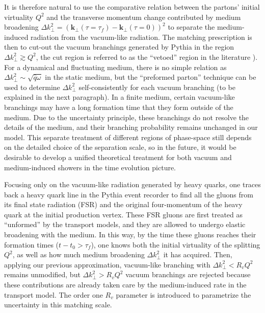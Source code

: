 It is therefore natural to use the comparative relation between the partons' initial virtuality $Q^2$ and the transverse momentum change contributed by medium broadening $\Delta k_\perp^2 = (\mathbf{k}_\perp(\tau=\tau_f) - \mathbf{k}_\perp(\tau=0))^2$ to separate the medium-induced radiation from the vacuum-like radiation.
The matching prescription is then to cut-out the vacuum branchings generated by Pythia in the region $\Delta k_\perp^2 \gtrsim Q^2$, the cut region is referred to as the ``vetoed'' region in the literature \cite{PhysRevLett.120.232001}).
For a dynamical and fluctuating medium, there is no simple relation as $\Delta k_\perp^2\sim \sqrt{\hat{q}\omega}$ in the static medium, but the ``preformed parton'' technique can be used to determine $\Delta k_\perp^2$ self-consistently for each vacuum branching (to be explained in the next paragraph).
In a finite medium, certain vacuum-like branchings may have a long formation time that they form outside of the medium.
Due to the uncertainty principle, these branchings do not resolve the details of the medium, and their branching probability remains unchanged in our model.
This separate treatment of different regions of phase-space still depends on the detailed choice of the separation scale, so in the future, it would be desirable to develop a unified theoretical treatment for both vacuum and medium-induced showers in the time evolution picture.

Focusing only on the vacuum-like radiation generated by heavy quarks, one traces back a heavy quark line in the Pythia event recorder to find all the gluons from its final state radiation (FSR) and the original four-momentum of the heavy quark at the initial production vertex.
These FSR gluons are first treated as ``unformed'' by the transport models, and they are allowed to undergo elastic broadening with the medium.
In this way, by the time these gluons reaches their formation times ($t-t_0>\tau_f$), one knows both the initial virtuality of the splitting $Q^2$, as well as how much medium broadening $\Delta k_\perp^2$ it has acquired.
Then, applying our previous approximation, vacuum-like branching with 
$\Delta k_\perp^2 < R_v Q^2$ remains unmodified, but $\Delta k_\perp^2 > R_v Q^2$ vacuum branchings are rejected because these contributions are already taken care by the medium-induced rate in the transport model.
The order one $R_v$ parameter is introduced to parametrize the uncertainty in this matching scale.

